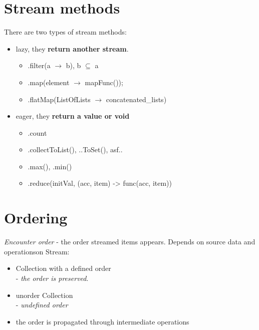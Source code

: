 \documentclass{report}
\begin{document}
\section{Stream methods}
There are two types of stream methods:
\begin{itemize}
	\item lazy, they \textbf{return another stream}.
	\begin{itemize}
		\item  .filter(a $\rightarrow$ b), b $\subseteq$ a
		\item .map(element  $\rightarrow$ mapFunc());
		\item .flatMap(ListOfLists  $\rightarrow$ concatenated\_lists)
	\end{itemize}
	 
	\item  eager, they \textbf{return a value or void}
 	\begin{itemize}
 		\item .count
 		\item  .collectToList(), ..ToSet(), asf..
 		\item .max(), .min()
 		\item .reduce(initVal, (acc, item) -> func(acc, item))
 	\end{itemize}
\end{itemize}

\section{Ordering}
\textit{Encounter order} - the order streamed items appears. Depends on source data and operationson Stream:
\begin{itemize}
	\item Collection with a defined order\\
	 - \textit{the order is preserved}.
	 \item unorder Collection\\
	 - \textit{undefined order}
	 \item the order is propagated through intermediate operations
\end{itemize}
\end{document}

